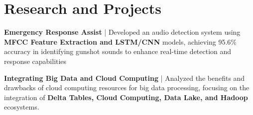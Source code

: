 \documentclass[a4paper,3pt]{article}
\begin{document}
\section{Research and Projects}

\begin{minipage}[t]{\linewidth}
    \textbf{Emergency Response Assist} | Developed an audio detection system using \textbf{MFCC Feature Extraction and LSTM/CNN} models, achieving 95.6\% accuracy in identifying gunshot sounds to enhance real-time detection and response capabilities
\end{minipage}



\begin{minipage}[t]{\linewidth}
    \textbf{Integrating Big Data and Cloud Computing} | Analyzed the benefits and drawbacks of cloud computing resources for big data processing, focusing on the integration of \textbf{Delta Tables, Cloud Computing, Data Lake, and Hadoop} ecosystems.
\end{minipage}
\end{document}
